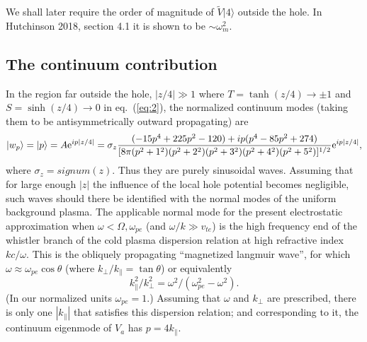 \documentclass[12pt]{article}
\def\ket#1{|#1\rangle}
\def\etothe#1{{\rm e}^{#1}}
\begin{document}
We shall later require  the order of magnitude of $\tilde V\ket{4}$
outside the hole.  In Hutchinson 2018,
section 4.1 it is shown to be $\sim \omega_m^2$.


\subsection{The continuum contribution}

In the region far outside the hole, $|z/4|\gg 1$ where
$T=\tanh(z/4)\to\pm1$ and $S=\sinh(z/4)\to0$ in eq.\ (\ref{eq:2}), the
normalized continuum modes (taking them to be antisymmetrically
outward propagating) are
\begin{equation}
  \label{eq:14}
 \ket{w_p}= \ket{p}=A\etothe{ip|z/4|}=\sigma_z{(-15p^4+225p^2-120) +ip (p^{4}-85p^{2}+274)\over
      [8\pi(p^2+1^2)(p^2+2^2)(p^2+3^2)(p^2+4^2)(p^2+5^2)]^{1/2}}\etothe{ip|z/4|},
\end{equation}
where $\sigma_z=signum(z)$. Thus they are purely sinusoidal
waves. Assuming that for large enough $|z|$ the influence of the local
hole potential becomes negligible, such waves should there be
identified with the normal modes of the uniform background plasma.
The applicable normal mode for the present electrostatic approximation
when $\omega<\Omega,\omega_{pe}$ (and $\omega/k\gg v_{te}$) is the high
frequency end of the whistler branch of the cold plasma dispersion
relation at high refractive index $kc/\omega$. This is the obliquely
propagating ``magnetized langmuir wave'', for which
$\omega\approx\omega_{pe}\cos\theta$ (where
$k_\perp/k_\parallel=\tan\theta$) or equivalently
\begin{equation}
  \label{eq:15}
  k_\parallel^2/k_\perp^2=\omega^2/(\omega_{pe}^2-\omega^2).
\end{equation}
(In our normalized units $\omega_{pe}=1$.)  Assuming that $\omega$ and
$k_\perp$ are prescribed, there is only one $|k_\parallel|$ that
satisfies this dispersion relation; and corresponding to it, the
continuum eigenmode of $V_a$ has $p=4k_\parallel$.
\end{document}
